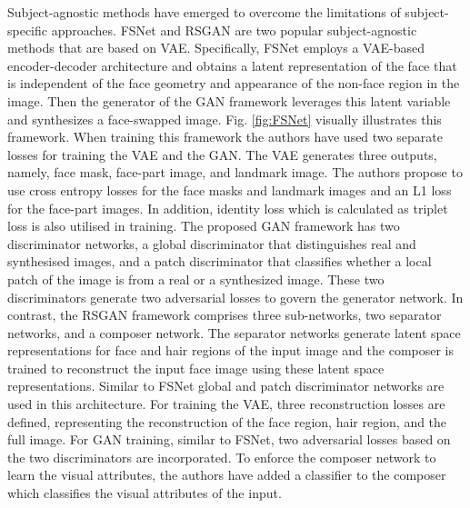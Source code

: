 Subject-agnostic methods have emerged to overcome the limitations of subject-specific approaches. FSNet \cite{natsume2019fsnet} and RSGAN \cite{natsume2018rsgan} are two popular subject-agnostic methods that are based on VAE. Specifically, FSNet employs a VAE-based encoder-decoder architecture and obtains a latent representation of the face that is independent of the face geometry and appearance of the non-face region in the image. Then the generator of the GAN framework leverages this latent variable and synthesizes a face-swapped image. Fig. \ref{fig:FSNet} visually illustrates this framework. When training this framework the authors have used two separate losses for training the VAE and the GAN. The VAE generates three outputs, namely, face mask, face-part image, and landmark image. The authors propose to use cross entropy losses for the face masks and landmark images and an L1 loss for the face-part images. In addition, identity loss which is calculated as triplet loss is also utilised in training. The proposed GAN framework has two discriminator networks, a global discriminator that distinguishes real and synthesised images, and a patch discriminator that classifies whether a local patch of the image is from a real or a synthesized image. These two discriminators generate two adversarial losses to govern the generator network. In contrast, the RSGAN framework comprises three sub-networks, two separator networks, and a composer network. The separator networks generate latent space representations for face and hair regions of the input image and the composer is trained to reconstruct the input face image using these latent space representations. Similar to FSNet global and patch discriminator networks are used in this architecture. For training the VAE, three reconstruction losses are defined, representing the reconstruction of the face region, hair region, and the full image. For GAN training, similar to FSNet, two adversarial losses based on the two discriminators are incorporated. To enforce the composer network to learn the visual attributes, the authors have added a classifier to the composer which classifies the visual attributes of the input.


